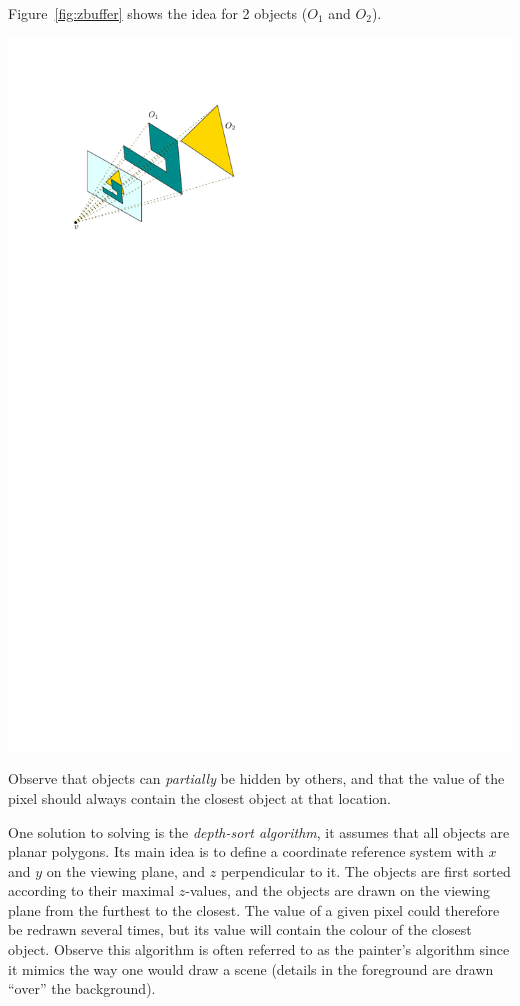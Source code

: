 %

Figure~\ref{fig:zbuffer} shows the idea for 2 objects ($O_1$ and $O_2$).
\begin{marginfigure}
  \centering
  \includegraphics[width=\linewidth]{zbuffer.pdf}
  \caption{}%
\label{fig:zbuffer}
\end{marginfigure}
Observe that objects can \emph{partially} be hidden by others, and that the value of the pixel should always contain the closest object at that location.

%

One solution to solving is the \emph{depth-sort algorithm}, it assumes that all objects are planar polygons.
Its main idea is to define a coordinate reference system with $x$ and $y$ on the viewing plane, and $z$ perpendicular to it.
The objects are first sorted according to their maximal $z$-values, and the objects are drawn on the viewing plane from the furthest to the closest.
The value of a given pixel could therefore be redrawn several times, but its value will contain the colour of the closest object.
Observe this algorithm is often referred to as the painter's algorithm since it mimics the way one would draw a scene (details in the foreground are drawn ``over'' the background).

